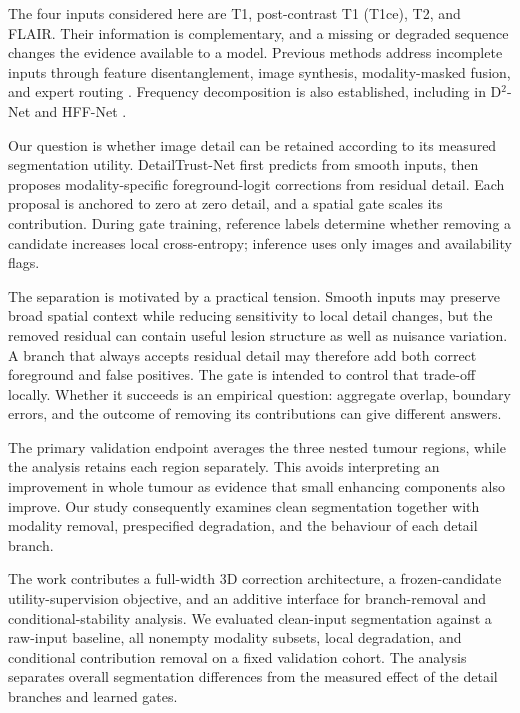 \documentclass[conference]{IEEEtran}
\begin{document}
The four inputs considered here are T1, post-contrast T1 (T1ce), T2, and FLAIR. Their information is complementary, and a missing or degraded sequence changes the evidence available to a model. Previous methods address incomplete inputs through feature disentanglement, image synthesis, modality-masked fusion, and expert routing \cite{yang2022d2,yang2023hyper,shi2024m2f,zhang2025mome}. Frequency decomposition is also established, including in D$^2$-Net and HFF-Net \cite{yang2022d2,shao2025hff}.

Our question is whether image detail can be retained according to its measured segmentation utility. DetailTrust-Net first predicts from smooth inputs, then proposes modality-specific foreground-logit corrections from residual detail. Each proposal is anchored to zero at zero detail, and a spatial gate scales its contribution. During gate training, reference labels determine whether removing a candidate increases local cross-entropy; inference uses only images and availability flags.

The separation is motivated by a practical tension. Smooth inputs may preserve broad spatial context while reducing sensitivity to local detail changes, but the removed residual can contain useful lesion structure as well as nuisance variation. A branch that always accepts residual detail may therefore add both correct foreground and false positives. The gate is intended to control that trade-off locally. Whether it succeeds is an empirical question: aggregate overlap, boundary errors, and the outcome of removing its contributions can give different answers.

The primary validation endpoint averages the three nested tumour regions, while the analysis retains each region separately. This avoids interpreting an improvement in whole tumour as evidence that small enhancing components also improve. Our study consequently examines clean segmentation together with modality removal, prespecified degradation, and the behaviour of each detail branch.

The work contributes a full-width 3D correction architecture, a frozen-candidate utility-supervision objective, and an additive interface for branch-removal and conditional-stability analysis. We evaluated clean-input segmentation against a raw-input baseline, all nonempty modality subsets, local degradation, and conditional contribution removal on a fixed validation cohort. The analysis separates overall segmentation differences from the measured effect of the detail branches and learned gates.
\end{document}
